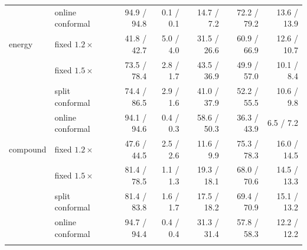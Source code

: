 \begin{table}[tb]
\begin{tabular}{llrrrrr}
 & online conformal & 94.9 / 94.8 & 0.1 / 0.1 & 14.7 / 7.2 & 72.2 / 79.2 & 13.6 / 13.9 \\
\addlinespace[2pt]
energy & fixed $1.2\times$ & 41.8 / 42.7 & 5.0 / 4.0 & 31.5 / 26.6 & 60.9 / 66.9 & 12.6 / 10.7 \\
 & fixed $1.5\times$ & 73.5 / 78.4 & 2.8 / 1.7 & 43.5 / 36.9 & 49.9 / 57.0 & 10.1 / 8.4 \\
 & split conformal & 74.4 / 86.5 & 2.9 / 1.6 & 41.0 / 37.9 & 52.2 / 55.5 & 10.6 / 9.8 \\
 & online conformal & 94.1 / 94.6 & 0.4 / 0.3 & 58.6 / 50.3 & 36.3 / 43.9 & 6.5 / 7.2 \\
\addlinespace[2pt]
compound & fixed $1.2\times$ & 47.6 / 44.5 & 2.5 / 2.6 & 11.6 / 9.9 & 75.3 / 78.3 & 16.0 / 14.5 \\
 & fixed $1.5\times$ & 81.4 / 78.5 & 1.1 / 1.3 & 19.3 / 18.1 & 68.0 / 70.6 & 14.5 / 13.3 \\
 & split conformal & 81.4 / 83.8 & 1.6 / 1.7 & 17.5 / 18.2 & 69.4 / 70.9 & 15.1 / 13.2 \\
 & online conformal & 94.7 / 94.4 & 0.4 / 0.4 & 31.3 / 31.4 & 57.8 / 58.3 & 12.2 / 12.2 \\
\addlinespace[2pt]
\bottomrule
\end{tabular}
\end{table}